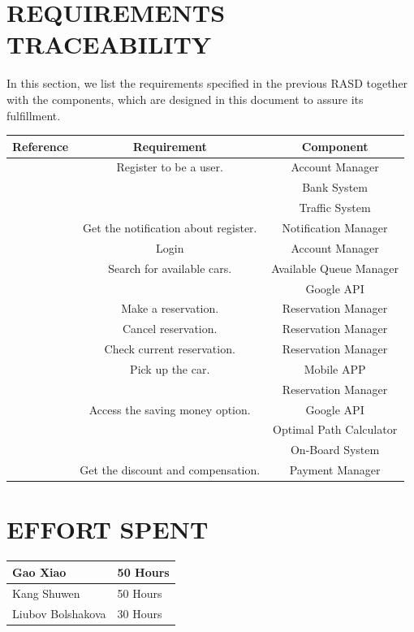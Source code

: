 \documentclass[a4paper,11pt]{article}
\begin{document}
\section{REQUIREMENTS TRACEABILITY}
In this section, we list the requirements specified in the previous RASD together with the components, which are designed in this document to assure its fulfillment.
\begin{center}
\renewcommand\arraystretch{2}
\begin{tabular}{|c|c|c|}
 \hline
Reference& Requirement& Component\\
 \hline
[1]& Register to be a user.& Account Manager \\
&&Bank System \\
&&Traffic System\\
 \hline
[2]& Get the notification about register. & Notification Manager \\
 \hline
 [3]& Login& Account Manager \\
 \hline
[4]& Search for available cars. & Available Queue Manager \\
&&Google API\\
 \hline
 [5]& Make a reservation.& Reservation Manager \\
 \hline
 [6]& Cancel reservation.& Reservation Manager \\
 \hline
 [7]& Check current reservation.& Reservation Manager \\
 \hline
 [8]& Pick up the car. & Mobile APP \\
&&Reservation Manager\\
 \hline
 [9]& Access the saving money option. & Google API \\
&&Optimal Path Calculator\\
&&On-Board System\\
 \hline
 [10]& Get the discount and compensation. & Payment Manager \\
 \hline
\end{tabular}
\end{center}
\newpage
\section{EFFORT SPENT}

\renewcommand\arraystretch{2}
\begin{tabular}{| p{5cm}| p{7cm}|}
 \hline
Gao Xiao& 50 Hours \\
 \hline
Kang Shuwen& 50 Hours \\
 \hline
Liubov Bolshakova& 30 Hours \\
 \hline

\end{tabular}
\end{document}
